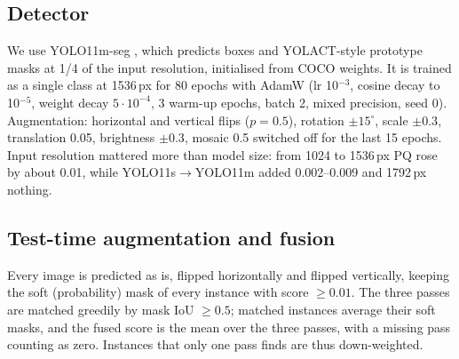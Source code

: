 \documentclass[sigconf]{acmart}
\begin{document}
\subsection{Detector}
We use YOLO11m-seg \cite{yolo11}, which predicts boxes and YOLACT-style prototype masks \cite{bolya2019yolact} at 1/4 of the input resolution, initialised from COCO \cite{lin2014coco} weights. It is trained as a single class at 1536\,px for 80 epochs with AdamW \cite{loshchilov2019adamw} (lr 10$^{-3}$, cosine decay to 10$^{-5}$, weight decay $5\cdot10^{-4}$, 3 warm-up epochs, batch 2, mixed precision, seed 0). Augmentation: horizontal and vertical flips ($p=0.5$), rotation $\pm15^\circ$, scale $\pm0.3$, translation 0.05, brightness $\pm0.3$, mosaic 0.5 switched off for the last 15 epochs. Input resolution mattered more than model size: from 1024 to 1536\,px PQ rose by about 0.01, while YOLO11s$\rightarrow$YOLO11m added 0.002--0.009 and 1792\,px nothing.

\subsection{Test-time augmentation and fusion}
Every image is predicted as is, flipped horizontally and flipped vertically, keeping the soft (probability) mask of every instance with score $\ge 0.01$. The three passes are matched greedily by mask IoU $\ge 0.5$; matched instances average their soft masks, and the fused score is the mean over the three passes, with a missing pass counting as zero. Instances that only one pass finds are thus down-weighted.
\end{document}
